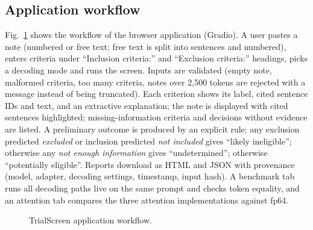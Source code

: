 \documentclass[conference]{IEEEtran}
\begin{document}
\subsection{Application workflow}
Fig.~\ref{fig:app} shows the workflow of the browser application (Gradio). A user pastes a note (numbered or free text; free text is split into sentences and numbered), enters criteria under ``Inclusion criteria:'' and ``Exclusion criteria:'' headings, picks a decoding mode and runs the screen. Inputs are validated (empty note, malformed criteria, too many criteria, notes over 2{,}500 tokens are rejected with a message instead of being truncated). Each criterion shows its label, cited sentence IDs and text, and an extractive explanation; the note is displayed with cited sentences highlighted; missing-information criteria and decisions without evidence are listed. A preliminary outcome is produced by an explicit rule: any exclusion predicted \emph{excluded} or inclusion predicted \emph{not included} gives ``likely ineligible''; otherwise any \emph{not enough information} gives ``undetermined''; otherwise ``potentially eligible''. Reports download as HTML and JSON with provenance (model, adapter, decoding settings, timestamp, input hash). A benchmark tab runs all decoding paths live on the same prompt and checks token equality, and an attention tab compares the three attention implementations against fp64.

\begin{figure}[t]\centering
{}
\caption{TrialScreen application workflow.}\label{fig:app}\end{figure}
\end{document}
